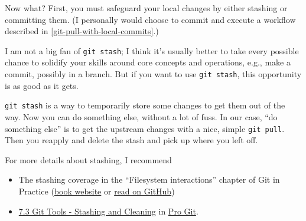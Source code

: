 \documentclass[
]{book}
\newenvironment{Shaded}{\begin{snugshade}}{\end{snugshade}}
\newcommand{\AttributeTok}[1]{\textcolor[rgb]{0.13,0.29,0.53}{#1}}
\newcommand{\ErrorTok}[1]{\textcolor[rgb]{0.64,0.00,0.00}{\textbf{#1}}}
\newcommand{\ExtensionTok}[1]{#1}
\newcommand{\KeywordTok}[1]{\textcolor[rgb]{0.13,0.29,0.53}{\textbf{#1}}}
\newcommand{\NormalTok}[1]{#1}
\newcommand{\OperatorTok}[1]{\textcolor[rgb]{0.81,0.36,0.00}{\textbf{#1}}}
\providecommand{\tightlist}{%
  \setlength{\itemsep}{0pt}\setlength{\parskip}{0pt}}
\begin{document}
\begin{Shaded}
\end{Shaded}

Now what? First, you must safeguard your local changes by either stashing or committing them. (I personally would choose to commit and execute a workflow described in \ref{git-pull-with-local-commits}.)

I am not a big fan of \texttt{git\ stash}; I think it's usually better to take every possible chance to solidify your skills around core concepts and operations, e.g., make a commit, possibly in a branch. But if you want to use \texttt{git\ stash}, this opportunity is as good as it gets.

\texttt{git\ stash} is a way to temporarily store some changes to get them out of the way. Now you can do something else, without a lot of fuss. In our case, ``do something else'' is to get the upstream changes with a nice, simple \texttt{git\ pull}. Then you reapply and delete the stash and pick up where you left off.

For more details about stashing, I recommend

\begin{itemize}
\tightlist
\item
  The stashing coverage in the ``Filesystem interactions'' chapter of Git in Practice (\href{https://gitinpractice.com}{book website} or \href{https://github.com/GitInPractice/GitInPractice\#readme}{read on GitHub})
\item
  \href{https://git-scm.com/book/en/v2/Git-Tools-Stashing-and-Cleaning}{7.3 Git Tools - Stashing and Cleaning} in \href{https://git-scm.com/book/en/v2}{Pro Git}.
\end{itemize}
\end{document}
